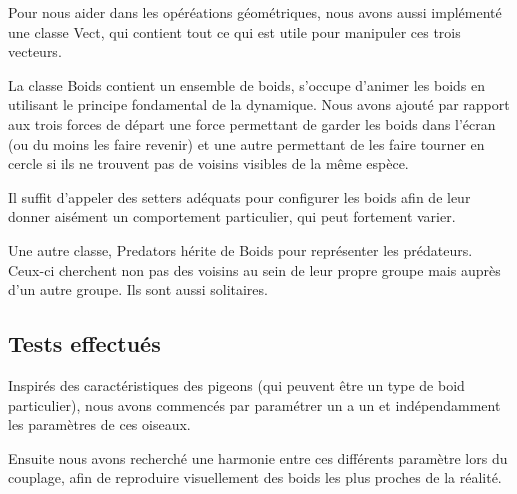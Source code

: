 \documentclass[a4paper, 11pt]{article}
\begin{document}
Pour nous aider dans les opéréations géométriques, nous avons aussi implémenté une classe Vect, qui contient tout ce qui est utile pour manipuler ces trois vecteurs.

La classe Boids contient un ensemble de boids, s'occupe d'animer les boids en utilisant le principe fondamental de la dynamique.
Nous avons ajouté par rapport aux trois forces de départ une force permettant de garder les boids dans l'écran (ou du moins les faire revenir) et une autre permettant de les faire tourner en cercle si ils ne trouvent pas de voisins visibles de la même espèce.

Il suffit d'appeler des setters adéquats pour configurer les boids afin de leur donner aisément un comportement particulier, qui peut fortement varier.

Une autre classe, Predators hérite de Boids pour représenter les prédateurs. Ceux-ci cherchent non pas des voisins au sein de leur propre groupe mais auprès d'un autre groupe. Ils sont aussi solitaires.

\subsection*{Tests effectués}

Inspirés des caractéristiques des pigeons (qui peuvent être un type de boid particulier), nous avons commencés par paramétrer un a un et indépendamment les paramètres de ces oiseaux.

Ensuite nous avons recherché une harmonie entre ces différents paramètre lors du couplage, afin de reproduire visuellement des boids les plus proches de la réalité.
\end{document}
